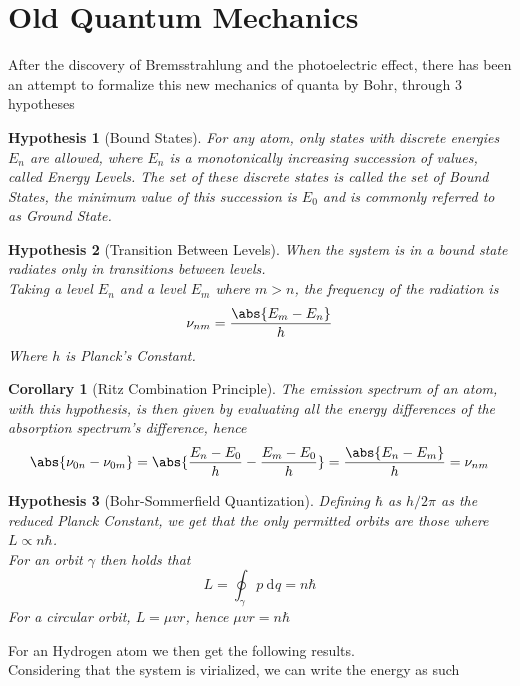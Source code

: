 \documentclass[a4paper, 11pt]{book}
\newcommand{\1}{\opr{\mathds{1}}}
\newcommand{\diff}[2][]{\ \mathrm{d}^{#1}#2}
\theoremstyle{plain}
\newtheorem{cor}{Corollary}
\newtheorem{hyp}{Hypothesis}
\begin{document}
	\section{Old Quantum Mechanics}
	After the discovery of Bremsstrahlung and the photoelectric effect, there has been an attempt to formalize this new mechanics of quanta by Bohr, through 3 hypotheses
	\begin{hyp}[Bound States]
		For any atom, only states with discrete energies $E_n$ are allowed, where $E_n$ is a monotonically increasing succession of values, called Energy Levels. The set of these discrete states is called the set of Bound States, the minimum value of this succession is $E_0$ and is commonly referred to as Ground State.
	\end{hyp}
	\begin{hyp}[Transition Between Levels]
		When the system is in a bound state radiates only in transitions between levels.\\
		Taking a level $E_n$ and a level $E_m$ where $m>n$, the frequency of the radiation is
		\begin{equation*}
			\nu_{nm}=\frac{\abs{E_m-E_n}}{h}
		\end{equation*}
		Where $h$ is Planck's Constant.
	\end{hyp}
	\begin{cor}[Ritz Combination Principle]
		The emission spectrum of an atom, with this hypothesis, is then given by evaluating all the energy differences of the absorption spectrum's difference, hence
		\begin{equation*}
			\abs{\nu_{0n}-\nu_{0m}}=\abs{\frac{E_n-E_0}{h}-\frac{E_m-E_0}{h}}=\frac{\abs{E_n-E_m}}{h}=\nu_{nm}
		\end{equation*}
	\end{cor}
	\begin{hyp}[Bohr-Sommerfield Quantization]
		Defining $\hbar$ as $h/2\pi$ as the reduced Planck Constant, we get that the only permitted orbits are those where $L\propto n\hbar$.\\
		For an orbit $\gamma$ then holds that
		\begin{equation*}
			L=\oint_{\gamma}p\diff{q}=n\hbar
		\end{equation*}
		For a circular orbit, $L=\mu vr$, hence
		$\mu vr=n\hbar$
	\end{hyp}
	For an Hydrogen atom we then get the following results.\\
	Considering that the system is virialized, we can write the energy as such
\end{document}
